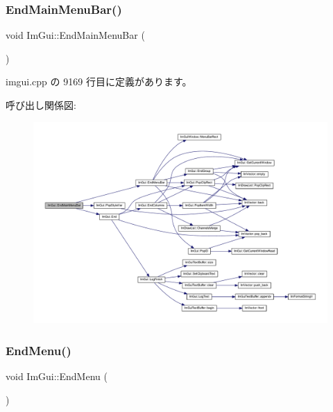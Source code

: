 \mbox{\label{namespace_im_gui_ab92f330c808546b340eb7bdf7e5f7c95}} 
\subsubsection{\texorpdfstring{End\+Main\+Menu\+Bar()}{EndMainMenuBar()}}
{\footnotesize\ttfamily void Im\+Gui\+::\+End\+Main\+Menu\+Bar (\begin{DoxyParamCaption}{ }\end{DoxyParamCaption})}



 imgui.\+cpp の 9169 行目に定義があります。

呼び出し関係図\+:\nopagebreak
\begin{figure}[H]
\begin{center}
\leavevmode
\includegraphics[width=350pt]{namespace_im_gui_ab92f330c808546b340eb7bdf7e5f7c95_cgraph}
\end{center}
\end{figure}
\mbox{\label{namespace_im_gui_a1448a5a4e8c431c15f991e9255c0df95}} 
\subsubsection{\texorpdfstring{End\+Menu()}{EndMenu()}}
{\footnotesize\ttfamily void Im\+Gui\+::\+End\+Menu (\begin{DoxyParamCaption}{ }\end{DoxyParamCaption})}



